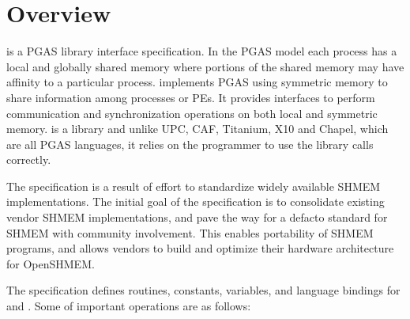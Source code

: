 \section{Overview}
\openshmem is a \ac{PGAS} library interface specification. In the \ac{PGAS} model each process has a local and 
globally shared memory where portions of the shared memory may have affinity to a particular process. \openshmem 
implements \ac{PGAS} using symmetric memory to share information among processes or \ac{PE}s.   
It provides interfaces to perform communication and synchronization operations on both local and symmetric memory. 
\openshmem is a library and unlike UPC, CAF, Titanium, X10 and Chapel, which are all
PGAS languages, it relies on the programmer to use the library calls correctly.

The \openshmem specification is a result of effort to standardize widely available SHMEM implementations. 
The initial goal of the specification is to consolidate existing vendor SHMEM implementations, and  pave the way for 
a defacto standard for SHMEM with community involvement. This enables portability of SHMEM programs, and 
allows vendors to build and optimize their hardware architecture for OpenSHMEM.

The \openshmem specification defines routines, constants, variables, and language bindings for \Clang{} and \Fortran.
Some of important \openshmem operations are as follows:

